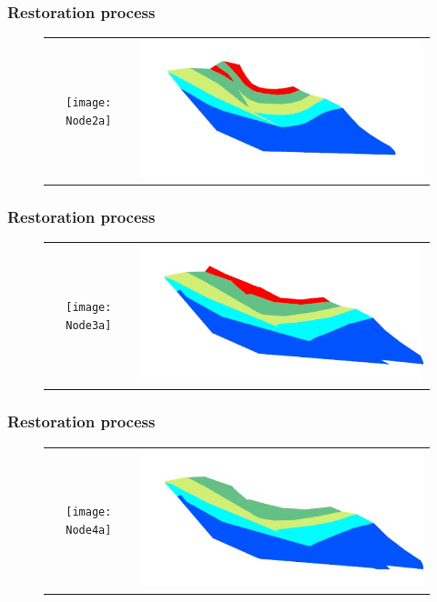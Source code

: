 \documentclass{beamer}
\begin{document}
	\begin{frame}
	\frametitle{Restoration process}
	\begin{figure}[H]
	\centering
	\begin{tabular}{@{}cc@{}}
	\texttt{[image: Node2a]}&
	\includegraphics[width=.65\textwidth]{chartreusedroite2.png}\\
	\end{tabular}
	\end{figure}
	\end{frame}
	
	\begin{frame}
	\frametitle{Restoration process}
	\begin{figure}[H]
	\centering
	\begin{tabular}{@{}cc@{}}
	\texttt{[image: Node3a]}&
	\includegraphics[width=.65\textwidth]{chartreusedroite5.png}\\
	\end{tabular}
	\end{figure}
	\end{frame}
	
	\begin{frame}
	\frametitle{Restoration process}
	\begin{figure}[H]
	\centering
	\begin{tabular}{@{}cc@{}}
	\texttt{[image: Node4a]}&
	\includegraphics[width=.65\textwidth]{chartreusedroite6.png}\\
	\end{tabular}
	\end{figure}
	\end{frame}
	
\end{document}
